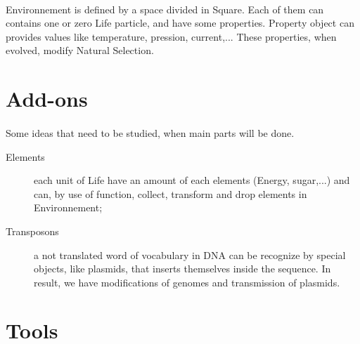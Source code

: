 \documentclass{report} %
\begin{document}
    \paragraph*{}
    Environnement is defined by a space divided in Square. Each of them can contains one or zero Life particle, 
    and have some properties.
    Property object can provides values like temperature, pression, current,...
    These properties, when evolved, modify Natural Selection.



\section*{Add-ons}
    \paragraph*{}
    Some ideas that need to be studied, when main parts will be done.
    \begin{description}
            \item[Elements] each unit of Life have an amount of each elements (Energy, sugar,...) and can, by use of function, collect, transform and drop elements in Environnement; 
            \item[Transposons] a not translated word of vocabulary in DNA can be recognize by special objects, like plasmids, that inserts themselves inside the sequence. 
                    In result, we have modifications of genomes and transmission of plasmids.
    \end{description}



\section*{Tools}
\end{document}
